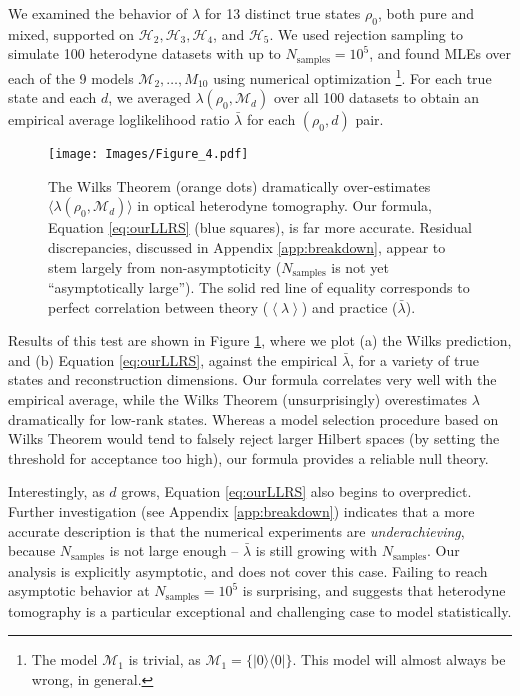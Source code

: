 \documentclass[aps,pra, twocolumn]{revtex4}
\newcommand{\M}{\mathcal{M}}
\newcommand{\expect}[1]{\ensuremath{\left\langle#1\right\rangle}}
\begin{document}
We examined the behavior of $\lambda$ for 13 distinct true states $\rho_{0}$, both pure and mixed, supported on $\mathcal{H}_{2}, \mathcal{H}_{3}, \mathcal{H}
_{4}$, and $\mathcal{H}_{5}$.  We used rejection sampling to simulate 100 heterodyne datasets with up to $N_{\mathrm{samples}}=10^5$, and found MLEs over each of the 9 models $\M_2, \ldots, M_{10}$ using numerical optimization \footnote{The model $\M_{1}$ is trivial, as $\M_{1} = \{|0\rangle \langle 0|\}$. This model will almost always be wrong, in general.}.  For each true state and each $d$, we averaged $\lambda(\rho_{0}, \M_{d})$ over all 100 datasets to obtain an empirical average loglikelihood ratio $\bar{\lambda}$ for each $(\rho_0,d)$ pair.

\begin{figure}[h]
 \texttt{[image: Images/Figure\_4.pdf]}
 \caption{The Wilks Theorem (orange dots) dramatically over-estimates $\langle\lambda(\rho_{0}, \M_{d})\rangle$ in optical heterodyne tomography. Our formula, Equation \ref{eq:ourLLRS} (blue squares), is far more accurate. Residual discrepancies, discussed in Appendix \ref{app:breakdown}, appear to stem largely from non-asymptoticity ($N_{\mathrm{samples}}$ is not yet ``asymptotically large''). The solid red line of equality corresponds to perfect correlation between theory ($\expect{\lambda}$) and practice ($\bar\lambda$).}
 \label{fig:modelcomp}
\end{figure}

Results of this test are shown in Figure \ref{fig:modelcomp}, where we plot (a) the Wilks prediction, and (b) Equation \eqref{eq:ourLLRS}, against the empirical $\bar\lambda$, for a variety of true states and reconstruction dimensions.  Our formula correlates very well with the empirical average, while the Wilks Theorem (unsurprisingly) overestimates $\lambda$ dramatically for low-rank states.  Whereas a model selection procedure based on Wilks Theorem would tend to falsely reject larger Hilbert spaces (by setting the threshold for acceptance too high), our formula provides a reliable null theory.

Interestingly, as $d$ grows, Equation \eqref{eq:ourLLRS} also begins to overpredict.  Further investigation (see Appendix \ref{app:breakdown}) indicates that a more accurate description is that the numerical experiments are \emph{underachieving}, because $N_{\mathrm{samples}}$ is not large enough -- $\bar\lambda$ is still growing with $N_{\mathrm{samples}}$.  Our analysis is explicitly asymptotic, and does not cover this case.  Failing to reach asymptotic behavior at $N_{\mathrm{samples}}=10^5$ is surprising, and suggests that heterodyne tomography is a particular exceptional and challenging case to model statistically.
\end{document}
